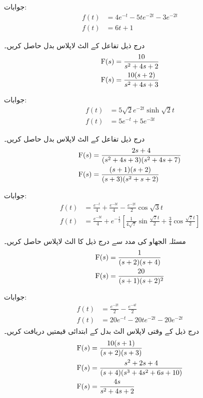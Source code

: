 جوابات:
\begin{align*}
f(t)&=4e^{-t}-5te^{-2t}-3e^{-2t}\\
f(t)&=6t+1
\end{align*}

درج ذیل تفاعل کے الٹ لاپلاس بدل حاصل کریں۔
\begin{align*}
{\ensuremath{{\textup{F}}}}(s)&=\frac{10}{s^2+4s+2}\\
{{\textup{F}}}(s)&=\frac{10(s+2)}{s^2+4s+3}
\end{align*}

جوابات:
\begin{align*}
f(t)&=5\sqrt{2}e^{-2t}\sinh \sqrt{2}t\\
f(t)&=5e^{-t}+5e^{-3t}
\end{align*}

درج ذیل تفاعل کے الٹ لاپلاس بدل حاصل کریں۔
\begin{align*}
{\ensuremath{{\textup{F}}}}(s)&=\frac{2s+4}{(s^2+4s+3)(s^2+4s+7)}\\
{{\textup{F}}}(s)&=\frac{(s+1)(s+2)}{(s+3)(s^2+s+2)}
\end{align*}

جوابات:
\begin{align*}
f(t)&=\frac{e^{-t}}{4}+\frac{e^{-3t}}{4}-\frac{e^{-2t}}{2}\cos \sqrt{3}t\\
f(t)&=\frac{e^{-3t}}{4}+e^{-\frac{t}{2}}\left[\frac{1}{4\sqrt{7}} \sin \frac{\sqrt{7}t}{2}+\frac{3}{4}\cos \frac{\sqrt{7}t}{2}\right]
\end{align*}

مسئلہ الجھاو کی مدد سے درج ذیل کا الٹ لاپلاس حاصل کریں۔
\begin{align*}
{\ensuremath{{\textup{F}}}}(s)&=\frac{1}{(s+2)(s+4)}\\
{{\textup{F}}}(s)&=\frac{20}{(s+1)(s+2)^2}
\end{align*} 

جوابات:
\begin{align*}
f(t)&=\frac{e^{-2t}}{2}-\frac{e^{-4t}}{2}\\
f(t)&=20e^{-t}-20te^{-2t}-20e^{-2t}
\end{align*}
درج ذیل  کے وقتی لاپلاس الٹ بدل  کے ابتدائی قیمتیں دریافت کریں۔
\begin{align*}
{\ensuremath{{\textup{F}}}}(s)&=\frac{10(s+1)}{(s+2)(s+3)}\\
{{\textup{F}}}(s)&=\frac{s^2+2s+4}{(s+4)(s^3+4s^2+6s+10)}\\
{{\textup{F}}}(s)&=\frac{4s}{s^2+4s+2}
\end{align*}

